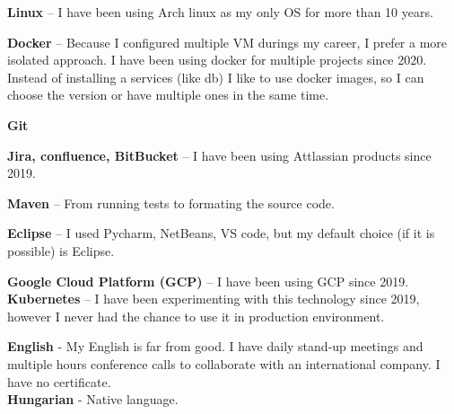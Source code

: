 \documentclass[9pt]{developercv} %
\begin{document}

\begin{minipage}[t]{0.49\textwidth}
	\vspace{-\baselineskip} %


	\textbf{Linux} -- I have been using Arch linux as my only OS for more than 10 years.

	\textbf{Docker} --
	Because I configured multiple VM durings my career, I prefer a more isolated approach.
	I have been using docker for multiple projects since 2020. \\
	Instead of installing a services (like db) I like to use docker images, 
	so I can choose the version or have multiple ones in the same time.

	\textbf{Git}

	\textbf{Jira, confluence, BitBucket} -- I have been using Attlassian products since 2019.

	\textbf{Maven} -- From running tests to formating the source code.

	\textbf{Eclipse} -- I used Pycharm, NetBeans, VS code, but my default choice (if it is possible) is Eclipse.

	\textbf{Google Cloud Platform (GCP)} -- I have been using GCP since 2019.
	\textbf{Kubernetes} -- I have been experimenting with this technology since 2019, however I never had the chance to use it in production environment.


	\textbf{English} - My English is far from good. I have daily stand-up meetings and multiple hours conference calls to collaborate with an international company. I have no certificate.\\
	\textbf{Hungarian} - Native language.
\end{minipage}
\hfill
\end{document}
